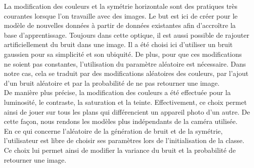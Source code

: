     La modification des couleurs et la symétrie horizontale sont des pratiques très courantes lorsque l'on travaille avec des images. Le but est ici de créer pour le modèle de nouvelles données à partir de données existantes afin d'accroître la base d'apprentissage. Toujours dans cette optique, il est aussi possible de rajouter artificiellement du bruit dans une image. Il a été choisi ici d'utiliser un bruit gaussien pour sa simplicité et son ubiquité. De plus, pour que ces modifications ne soient pas constantes, l'utilisation du paramètre aléatoire est nécessaire. Dans notre cas, cela se traduit par des modifications aléatoires des couleurs, par l'ajout d'un bruit aléatoire et par la probabilité de ne pas retourner une image.\\
    
    De manière plus précise, la modification des couleurs a été effectuée pour la luminosité, le contraste, la saturation et la teinte. Effectivement, ce choix permet ainsi de jouer sur tous les plans qui différencient un appareil photo d'un autre. De cette façon, nous rendons les modèles plus indépendants de la caméra utilisée.\\
    
    En ce qui concerne l'aléatoire de la génération de bruit et de la symétrie, l'utilisateur est libre de choisir ses paramètres lors de l'initialisation de la classe. Ce choix lui permet ainsi de modifier la variance du bruit et la probabilité de retourner une image.\\